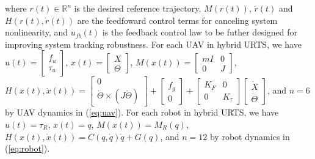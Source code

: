 \documentclass{ieeeaccess}
\begin{document}
where $r(t)\in\mathbb{R}^n$ is the desired reference trajectory, $M(r(t))$, $\ddot{r}(t)$ and $H(r(t), \dot{r}(t))$ are the feedfoward control terms for canceling system nonlinearity, and $u_{fb}(t)$ is the feedback control law to be futher designed for improving system tracking robustness. For each UAV in hybrid URTS, we have $u(t)=\begin{bmatrix}
    f_u \\ \tau_u
\end{bmatrix}$, $x(t)=\begin{bmatrix}
    X \\ \Theta
\end{bmatrix}$, $M(x(t))=\begin{bmatrix}
    mI & 0 \\ 0 & J
\end{bmatrix}$, $H(x(t),\dot{x}(t))=\begin{bmatrix}
    0 \\ \dot{\Theta}\times(J\dot{\Theta})
\end{bmatrix}+\begin{bmatrix}
    f_g \\ 0
\end{bmatrix}+\begin{bmatrix}
    K_F & 0 \\
    0 & K_\tau
\end{bmatrix}\begin{bmatrix}
    \dot{X} \\ \dot{\Theta}
\end{bmatrix}$, and $n=6$ by UAV dynamics in (\ref{eq:uav}). For each robot in hybrid URTS, we have $u(t)=\tau_R$, $x(t)=q$, $M(x(t))=M_R(q)$, $H(x(t),\dot{x}(t))=C(q,\dot{q})\dot{q} + G(q)$, and $n=12$ by robot dynamics in (\ref{eq:robot}).
\end{document}
